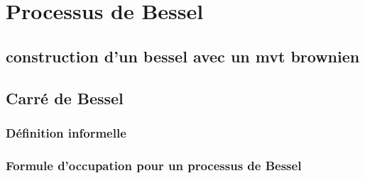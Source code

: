 \documentclass[openany]{book}
\theoremstyle{thmfont}
\theoremstyle{deffont}
\theoremstyle{thmfont}
\theoremstyle{deffont}
\begin{document}
\chapter{Processus de Bessel}
\section{construction d'un bessel avec un mvt brownien}
\section{Carré de Bessel}
\subsection{Définition informelle}
\subsection{Formule d'occupation pour un processus de Bessel}
\end{document}
